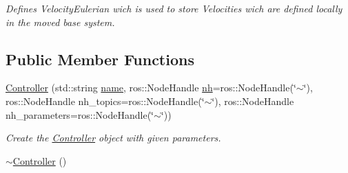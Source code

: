 \begin{DoxyCompactItemize}
\begin{DoxyCompactList}\small\item\em Defines Velocity\+Eulerian wich is used to store Velocities wich are defined locally in the moved base system. \end{DoxyCompactList}\end{DoxyCompactItemize}
\subsection*{Public Member Functions}
\begin{DoxyCompactItemize}
\item 
\hyperlink{classController_acc6aa82751ca6ddaa0152b6496c55478}{Controller} (std\+::string \hyperlink{classController_af81f22d8b64d915769acfb8e8d89e0c8}{name}, ros\+::\+Node\+Handle \hyperlink{classController_a24e3d3c2536f6ed29018bad1fd53dae2}{nh}=ros\+::\+Node\+Handle(\char`\"{}$\sim$\char`\"{}), ros\+::\+Node\+Handle nh\+\_\+topics=ros\+::\+Node\+Handle(\char`\"{}$\sim$\char`\"{}), ros\+::\+Node\+Handle nh\+\_\+parameters=ros\+::\+Node\+Handle(\char`\"{}$\sim$\char`\"{}))
\begin{DoxyCompactList}\small\item\em Create the \hyperlink{classController}{Controller} object with given parameters. \end{DoxyCompactList}\item 
\hyperlink{classController_a0ab87934c4f7a266cfdb86e0f36bc1b5}{$\sim$\+Controller} ()\hypertarget{classController_a0ab87934c4f7a266cfdb86e0f36bc1b5}{}\label{classController_a0ab87934c4f7a266cfdb86e0f36bc1b5}


\end{DoxyCompactItemize}

